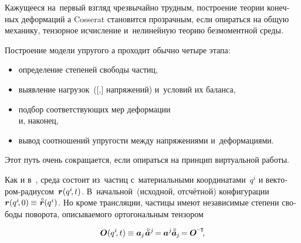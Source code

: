 \begin{otherlanguage}{russian}

Кажущееся на~первый взгляд чрезвычайно трудным, построение теории конечных деформаций \rucontinuum{}а Cosserat становится прозрачным, если опираться на общую механику, тензорное исчисление и~нелинейную теорию безмоментной среды.

Построение модели
упругого \rucontinuum{}а
проходит
обычно
четыре этапа:
\begin{itemize}
\item определение степеней свободы частиц,
\item выявление нагрузок~([,] напряжений) и~условий их баланса,
\item подбор соответствующих мер деформации
\\
\hspace*{-\listlabelwithsep}и, наконец,
\item вывод соотношений упругости между напряжениями и~деформациями.
\end{itemize}

\vspace{-0.16em}\noindent
Этот путь очень сокращается, если опираться на принцип виртуальной работы.

Как и в~, среда состоит из~частиц с~материальными координатами~$q^i$ и вектором\hbox{-}радиусом~${\bm{r}(q^i\hspace{-0.4ex}, t)}$.
В~начальной~(исходной, отсчётной) конфигурации ${\currentlocationvector(q^i\hspace{-0.4ex}, 0) \hspace{-0.12ex} \equiv \hspace{.12ex} \initiallocationvector(q^i)}$.
Но кроме трансляции, частицы имеют независимые степени свободы поворота, описываемого ортогональным тензором

\nopagebreak\vspace{-0.2em}\begin{equation*}
\rotationtensor(q^i\hspace{-0.4ex}, t) \hspace{-0.1ex}
\equiv
\bm{a}_{\hspace{-0.12ex}j} \hspace{.16ex} \mathcircabove{\bm{a}}^j \hspace{-0.32ex}
= \hspace{-0.1ex} \bm{a}^j \hspace{-0.12ex} \mathcircabove{\bm{a}}_{\hspace{-0.12ex}j} \hspace{-0.25ex}
= \hspace{-0.1ex} \rotationtensor^{\hspace{-0.1ex}\expminusT}
\hspace{-0.5ex} ,
\end{equation*}


\end{otherlanguage}
